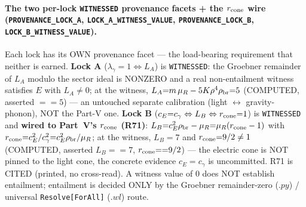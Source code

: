 \paragraph{The two per-lock \texttt{WITNESSED} provenance facets + the \(r_{\rm cone}\) wire (\texttt{PROVENANCE\_LOCK\_A}, \texttt{LOCK\_A\_WITNESS\_VALUE}, \texttt{PROVENANCE\_LOCK\_B}, \texttt{LOCK\_B\_WITNESS\_VALUE}).}
Each lock has its OWN provenance facet --- the load-bearing requirement that
neither is earned. \textbf{Lock A} (\(\lambda_\gamma{=}1\Leftrightarrow L_A\)) is
\texttt{WITNESSED}: the Groebner remainder of \(L_A\) modulo the sector ideal is
NONZERO and a real non-entailment witness satisfies \(E\) with \(L_A\neq0\); at
the witness, \(L_A{=}m\,\mu_R-5K\rho^4\rho_{\rm br}{=}5\) (COMPUTED, asserted
\(==5\)) --- an untouched separate calibration (light \(\leftrightarrow\)
gravity-phonon), NOT the Part-V one. \textbf{Lock B}
(\(c_E{=}c_\gamma\Leftrightarrow L_B\Leftrightarrow r_{\rm cone}{=}1\)) is
\texttt{WITNESSED} and \textbf{wired to Part~V's \(r_{\rm cone}\) (R71)}:
\(L_B{=}c_E^2\rho_{\rm br}-\mu_R{=}\mu_R(r_{\rm cone}-1)\) with
\(r_{\rm cone}{=}c_E^2/c_\gamma^2{=}c_E^2\rho_{\rm br}/\mu_R\); at the witness,
\(L_B{=}7\) and \(r_{\rm cone}{=}9/2\neq1\) (COMPUTED, asserted \(L_B{==}7\),
\(r_{\rm cone}{==}9/2\)) --- the electric cone is NOT pinned to the light cone,
the concrete evidence \(c_E{=}c_\gamma\) is uncommitted. R71 is CITED (printed, no
cross-read). A witness value of \(0\) does NOT establish entailment; entailment is
decided ONLY by the Groebner remainder-zero (\(.py\)) / universal
\texttt{Resolve[ForAll]} (\(.wl\)) route.

